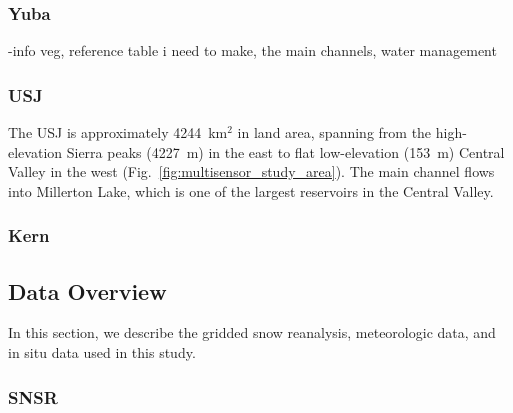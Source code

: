 \hypertarget{ch2-sa-1}{\subsubsection{Yuba}\label{ch2-sa-1}}

-info veg, reference table i need to make, the main channels, water management

\hypertarget{ch2-sa-2}{\subsubsection{USJ}\label{ch2-sa-2}}

The USJ is approximately 4244~km$^{2}$ in land area, spanning from the high-elevation Sierra peaks (4227~m) in the east to flat low-elevation (153~m) Central Valley in the west (Fig.~\ref{fig:multisensor_study_area}). The main channel flows into Millerton Lake, which is one of the largest reservoirs in the Central Valley. 

\hypertarget{ch2-sa-3}{\subsubsection{Kern}\label{ch2-sa-3}}


\hypertarget{ch2-do-1}{\subsection{Data Overview}\label{ch2-do-1}}

In this section, we describe the gridded snow reanalysis, meteorologic data, and in situ data used in this study.

\hypertarget{ch2-do-2}{\subsubsection{SNSR}\label{ch2-do-2}}

